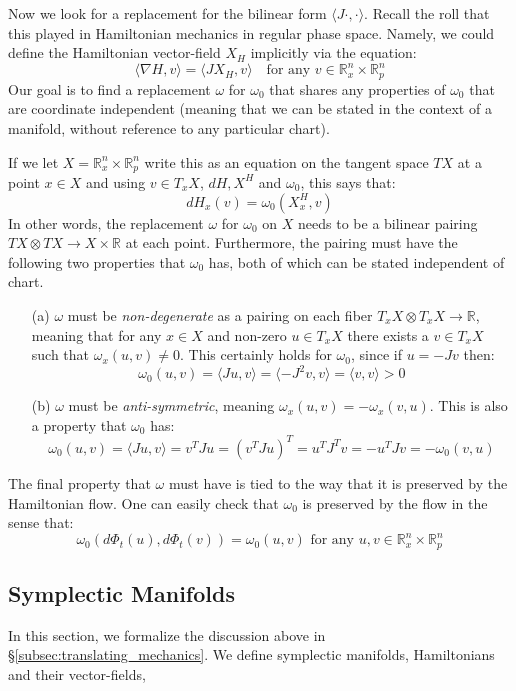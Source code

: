\documentclass[12pt]{article}
\theoremstyle{definition}
\numberwithin{equation}{section}
\newcommand{\R}{{\mathbb R}}
\begin{document}
Now we look for a replacement for the bilinear form $\langle J \cdot,\cdot\rangle$. Recall the roll that this played in Hamiltonian mechanics in regular phase space. Namely, we could define the Hamiltonian vector-field $X_H$ implicitly via the equation:
\[
\langle \nabla H,v\rangle = \langle JX_H,v\rangle \quad \text{for any $v \in \R^n_x \times \R^n_p$}
\]
Our goal is to find a replacement $\omega$ for $\omega_0$ that shares any properties of $\omega_0$ that are coordinate independent (meaning that we can be stated in the context of a manifold, without reference to any particular chart).

If we let $X = \R^n_x \times \R^n_p$ write this as an equation on the tangent space $TX$ at a point $x \in X$ and using $v \in T_xX$, $dH, X^H$ and $\omega_0$, this says that:
\[
dH_x(v) = \omega_0(X^H_x,v)
\]
In other words, the replacement $\omega$ for $\omega_0$ on $X$ needs to be a bilinear pairing $TX \otimes TX \to X \times \R$ at each point. Furthermore, the pairing must have the following two properties that $\omega_0$ has, both of which can be stated independent of chart.
\begin{itemize}
	\item[(a)] $\omega$ must be \emph{non-degenerate} as a pairing on each fiber $T_xX \otimes T_xX \to \R$, meaning that for any $x \in X$ and non-zero $u \in T_xX$ there exists a $v \in T_xX$ such that $\omega_x(u,v) \neq 0$. This certainly holds for $\omega_0$, since if $u = -Jv$ then:
	\[
	\omega_0(u,v) = \langle Ju,v\rangle = \langle -J^2 v,v\rangle = \langle v,v\rangle > 0
	\]
	\item[(b)] $\omega$ must be \emph{anti-symmetric}, meaning $\omega_x(u,v) = -\omega_x(v,u)$. This is also a property that $\omega_0$ has:
	\[
	\omega_0(u,v) = \langle Ju,v\rangle = v^TJu =(v^TJu)^T = u^TJ^Tv = -u^TJv = -\omega_0(v,u)
	\]
\end{itemize}

The final property that $\omega$ must have is tied to the way that it is preserved by the Hamiltonian flow. One can easily check that $\omega_0$ is preserved by the flow in the sense that:
\[
\omega_0(d\Phi_t(u),d\Phi_t(v)) = \omega_0(u,v) \text{ for any }u,v \in \R^n_x \times \R^n_p
\]

\subsection{Symplectic Manifolds} \label{subsec:symplectic_and_contact_manifolds} In this section, we formalize the discussion above in \S \ref{subsec:translating_mechanics}. We define symplectic manifolds, Hamiltonians and their vector-fields, 
\end{document}
